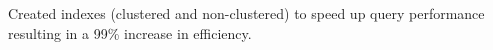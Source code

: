 \begin{cventries}
{\begin{cvitems}
        \item {Created indexes (clustered and non-clustered) to speed up query performance resulting in a 99\% increase in efficiency.}
      \end{cvitems}
    }
%
%
\end{cventries}
